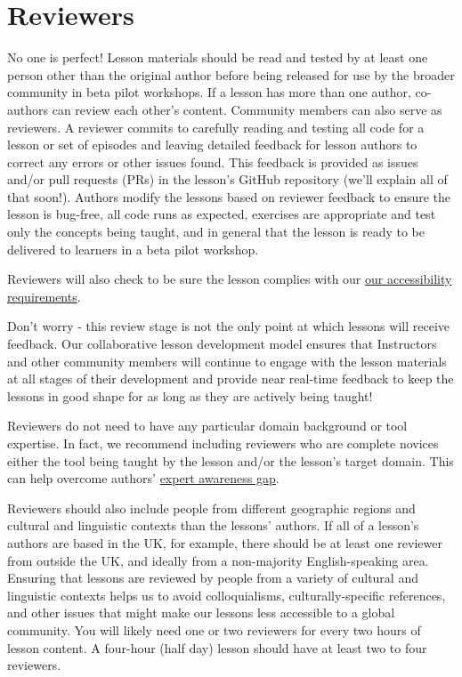 \documentclass[
]{book}
\begin{document}
\hypertarget{reviewers}{%
\section{Reviewers}\label{reviewers}}

No one is perfect! Lesson materials should be read and tested by at least
one person other than the original author before being released for use by the broader community in beta pilot workshops.
If a lesson has more than one author, co-authors can review each other's content.
Community members can also serve as reviewers. A reviewer commits to carefully
reading and testing all code for a lesson or set of episodes and leaving detailed
feedback for lesson authors to correct any errors or other issues found. This feedback is
provided as issues and/or pull requests (PRs) in the lesson's GitHub repository
(we'll explain all of that soon!). Authors modify the lessons based on reviewer feedback to ensure the
lesson is bug-free, all code runs as expected, exercises are appropriate and test
only the concepts being taught, and in general that the lesson is ready to be
delivered to learners in a beta pilot workshop.

Reviewers will also check to be sure the lesson complies with our
\href{link}{our accessibility requirements}.

Don't worry - this review stage is not the only point at which lessons will
receive feedback. Our collaborative lesson development model ensures that
Instructors and other community members will continue to engage with the lesson
materials at all stages of their development and provide near real-time feedback
to keep the lessons in good shape for as long as they are actively being taught!

Reviewers do not need to have any particular domain background or tool expertise.
In fact, we recommend including reviewers who are complete novices either
the tool being taught by the lesson and/or the lesson's target domain. This can
help overcome authors' \href{https://carpentries.github.io/instructor-training/03-expertise/index.html\#expertise-and-teaching}{expert awareness gap}.

Reviewers should also include people from different geographic regions and
cultural and linguistic contexts than the lessons' authors. If all of
a lesson's authors are based in the UK, for example, there should be at least
one reviewer from outside the UK, and ideally from a non-majority English-speaking
area. Ensuring that lessons are reviewed by people from a variety of cultural and linguistic
contexts helps us to avoid colloquialisms, culturally-specific references, and other issues that might make our lessons less accessible to a global community. You will likely need one or two reviewers for every
two hours of lesson content. A four-hour (half day) lesson should have at least two to four reviewers.
\end{document}
